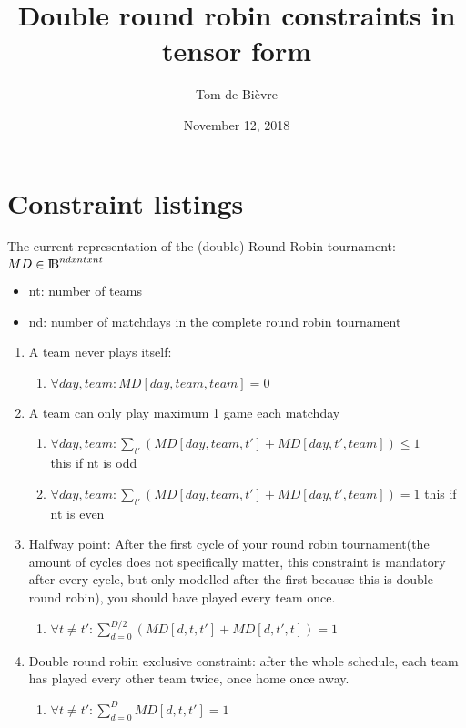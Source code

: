 \documentclass[titlepage]{article}%
\title{Double round robin constraints in tensor form}
\date{November 12, 2018}
\author{Tom de Bièvre}
\begin{document}
\maketitle
\section*{Constraint listings}
The current representation of the (double) Round Robin tournament: ${MD \in \rm I\!B}^{nd x nt x nt}$\\

\begin{itemize}  
	\item nt: number of teams
	\item nd: number of matchdays in the complete round robin tournament
\end{itemize}

\begin{enumerate}
 \item A team never plays itself: 
 \begin{enumerate}
 \item $\forall day,team : MD[day,team,team] = 0$
 \end{enumerate}
 
 \item A team can only play maximum 1 game each matchday
 \begin{enumerate}
 \item $\forall day,team : \sum\nolimits_{t'} ( MD[day,team,t'] + MD[day, t',team]) \leq 1$ \\
 this if nt is odd
 \item $\forall day,team : \sum\nolimits_{t'} ( MD[day,team,t'] + MD[day, t',team]) = 1 $ 
 this if nt is even 
 \end{enumerate}
 
 \item Halfway point: After the first cycle of your round robin tournament(the amount of cycles does not specifically matter, this constraint is mandatory after every cycle, but only modelled after the first because this is double round robin), you should have played every team once.
 
 \begin{enumerate}
 \item $\forall t \neq t': \sum\limits_{d=0}^{D/2} (MD[d,t,t'] + MD[d,t',t]) = 1$
 \end{enumerate}
 
 \item Double round robin exclusive constraint: after the whole schedule, each team has played every other team twice, once home once away. 
 \begin{enumerate}
 \item $\forall t \neq t': \sum\limits_{d=0}^{D} MD[d,t,t'] = 1$
 \end{enumerate}
\end{enumerate}   
\end{document}
